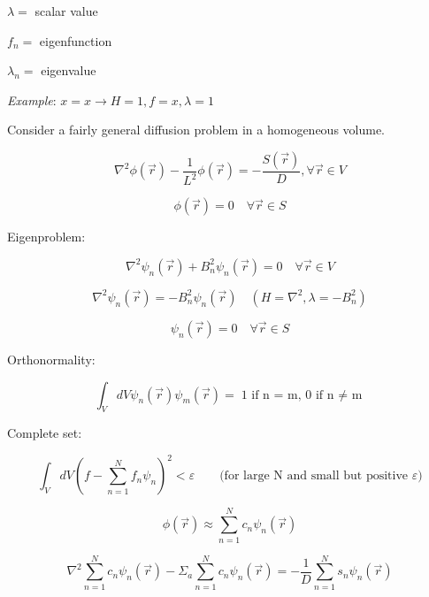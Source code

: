 \documentclass[12pt]{article}
\newcommand{\rvec}{\ensuremath{\vec{r}}}
\newcommand{\vecr}{\ensuremath{\vec{r}}}
\begin{document}
$\lambda =$ scalar value

$f_n =$ eigenfunction

$\lambda_n =$ eigenvalue


\emph{Example}: $x = x \rightarrow H = 1, f = x, \lambda = 1$ 

Consider a fairly general diffusion problem in a homogeneous volume.

\begin{equation*}
\nabla^2\phi(\vecr) - \frac{1}{L^2}\phi(\vecr) = -\frac{S(\rvec)}{D}, \forall \rvec \in V
\end{equation*}

\begin{equation*}
\phi(\rvec) = 0 \quad\forall \rvec \in S
\end{equation*}

Eigenproblem:

\begin{equation*}
\nabla^2\psi_n(\rvec) + B_n^2\psi_n(\rvec) = 0 \quad\forall \rvec \in V
\end{equation*}

\begin{equation*}
\nabla^2\psi_n(\rvec) = - B_n^2\psi_n(\rvec) \quad(H = \nabla^2, \lambda = -B_n^2)
\end{equation*}

\begin{equation*}
\psi_n(\rvec) = 0 \quad\forall \rvec \in S
\end{equation*}

Orthonormality:

\begin{equation*}
\int_V dV\psi_n(\rvec)\psi_m(\rvec) = \text{1 if n = m, 0 if n $\neq$ m}
\end{equation*}

Complete set:

\begin{equation*}
\int_V dV\left(f - \sum_{n=1}^N f_n\psi_n\right)^2 < \varepsilon \qquad 
\text{(for large N and small but positive $\varepsilon$)}
\end{equation*}

\begin{equation*}
\phi(\rvec) \approx \sum_{n=1}^N c_n\psi_n(\rvec)
\end{equation*}

\begin{equation*}
\nabla^2\sum_{n=1}^N c_n\psi_n(\rvec) - \Sigma_a\sum_{n=1}^N c_n\psi_n(\rvec) = 
-\frac{1}{D}\sum_{n=1}^N s_n\psi_n(\rvec)
\end{equation*}
\end{document}
